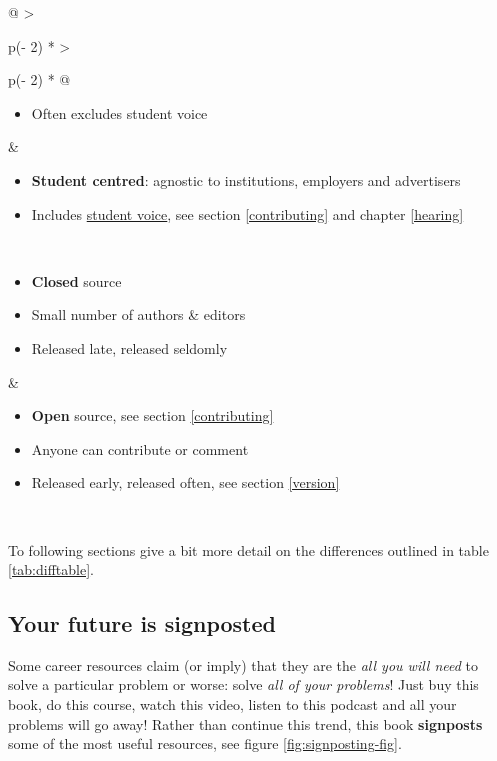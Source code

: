\documentclass[
]{book}
\providecommand{\tightlist}{%
  \setlength{\itemsep}{0pt}\setlength{\parskip}{0pt}}
\begin{document}
\begin{longtable}[]{@{}
  >{\raggedright\arraybackslash}p{(\columnwidth - 2\tabcolsep) * }
  >{\raggedright\arraybackslash}p{(\columnwidth - 2\tabcolsep) * }@{}}
\begin{minipage}[t]{\linewidth}
\begin{itemize}
\item
  Often excludes student voice
\end{itemize}
\end{minipage} & \begin{minipage}[t]{\linewidth}\raggedright
\begin{itemize}
\tightlist
\item
  \textbf{Student centred}: agnostic to institutions, employers and advertisers
\item
  Includes \href{https://en.wikipedia.org/wiki/Student_voice}{student voice}, see section \ref{contributing} and chapter \ref{hearing}
\end{itemize}
\end{minipage} \\
\begin{minipage}[t]{\linewidth}\raggedright
\begin{itemize}
\tightlist
\item
  \textbf{Closed} source
\item
  Small number of authors \& editors
\item
  Released late, released seldomly
\end{itemize}
\end{minipage} & \begin{minipage}[t]{\linewidth}\raggedright
\begin{itemize}
\tightlist
\item
  \textbf{Open} source, see section \ref{contributing}
\item
  Anyone can contribute or comment
\item
  Released early, released often, see section \ref{version}
\end{itemize}
\end{minipage} \\
\bottomrule
\end{longtable}









To following sections give a bit more detail on the differences outlined in table \ref{tab:difftable}.

\hypertarget{signposted}{%
\subsection{Your future is signposted}\label{signposted}}

Some career resources claim (or imply) that they are the \emph{all you will need} to solve a particular problem or worse: solve \emph{all of your problems}! Just buy this book, do this course, watch this video, listen to this podcast and all your problems will go away! Rather than continue this trend, this book \textbf{signposts} some of the most useful resources, see figure \ref{fig:signposting-fig}.
\end{document}
